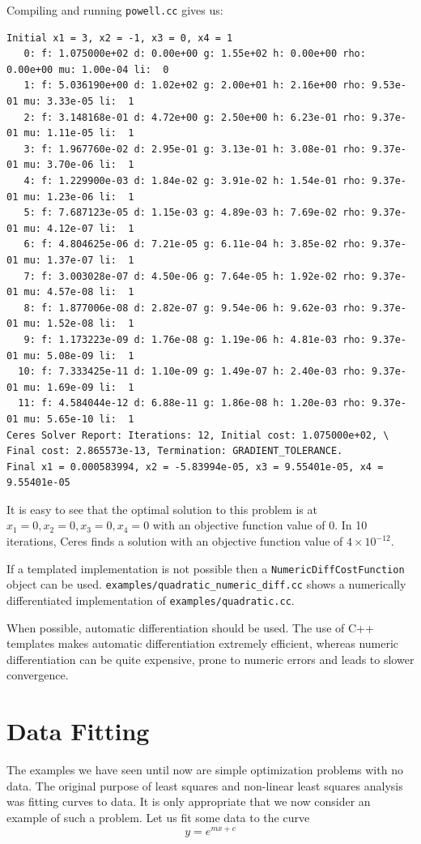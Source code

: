 Compiling and running \texttt{powell.cc} gives us:
\begin{verbatim}
Initial x1 = 3, x2 = -1, x3 = 0, x4 = 1
   0: f: 1.075000e+02 d: 0.00e+00 g: 1.55e+02 h: 0.00e+00 rho: 0.00e+00 mu: 1.00e-04 li:  0
   1: f: 5.036190e+00 d: 1.02e+02 g: 2.00e+01 h: 2.16e+00 rho: 9.53e-01 mu: 3.33e-05 li:  1
   2: f: 3.148168e-01 d: 4.72e+00 g: 2.50e+00 h: 6.23e-01 rho: 9.37e-01 mu: 1.11e-05 li:  1
   3: f: 1.967760e-02 d: 2.95e-01 g: 3.13e-01 h: 3.08e-01 rho: 9.37e-01 mu: 3.70e-06 li:  1
   4: f: 1.229900e-03 d: 1.84e-02 g: 3.91e-02 h: 1.54e-01 rho: 9.37e-01 mu: 1.23e-06 li:  1
   5: f: 7.687123e-05 d: 1.15e-03 g: 4.89e-03 h: 7.69e-02 rho: 9.37e-01 mu: 4.12e-07 li:  1
   6: f: 4.804625e-06 d: 7.21e-05 g: 6.11e-04 h: 3.85e-02 rho: 9.37e-01 mu: 1.37e-07 li:  1
   7: f: 3.003028e-07 d: 4.50e-06 g: 7.64e-05 h: 1.92e-02 rho: 9.37e-01 mu: 4.57e-08 li:  1
   8: f: 1.877006e-08 d: 2.82e-07 g: 9.54e-06 h: 9.62e-03 rho: 9.37e-01 mu: 1.52e-08 li:  1
   9: f: 1.173223e-09 d: 1.76e-08 g: 1.19e-06 h: 4.81e-03 rho: 9.37e-01 mu: 5.08e-09 li:  1
  10: f: 7.333425e-11 d: 1.10e-09 g: 1.49e-07 h: 2.40e-03 rho: 9.37e-01 mu: 1.69e-09 li:  1
  11: f: 4.584044e-12 d: 6.88e-11 g: 1.86e-08 h: 1.20e-03 rho: 9.37e-01 mu: 5.65e-10 li:  1
Ceres Solver Report: Iterations: 12, Initial cost: 1.075000e+02, \
Final cost: 2.865573e-13, Termination: GRADIENT_TOLERANCE.
Final x1 = 0.000583994, x2 = -5.83994e-05, x3 = 9.55401e-05, x4 = 9.55401e-05
\end{verbatim}
It is easy to see that the  optimal solution to this problem is at $x_1=0, x_2=0, x_3=0, x_4=0$ with an objective function value of $0$. In 10 iterations, Ceres finds a solution with an objective function value of $4\times 10^{-12}$.

If a templated implementation is not possible then a \texttt{NumericDiffCostFunction} object can be used. \texttt{examples/quadratic\_numeric\_diff.cc} shows a numerically differentiated implementation of \texttt{examples/quadratic.cc}.

When possible, automatic differentiation should be used. The use of
C++ templates makes automatic differentiation extremely efficient,
whereas numeric differentiation can be quite expensive, prone to
numeric errors and leads to slower convergence.

\section{Data Fitting}
\label{sec:tutorial:datafitting}
The examples we have seen until now are simple optimization problems with no data. The original purpose of least squares and non-linear least squares analysis was fitting curves to data. It is only appropriate that we now consider an example of such a problem. Let us fit some data to the curve
\begin{equation}
	y = e^{mx + c}
\end{equation}

